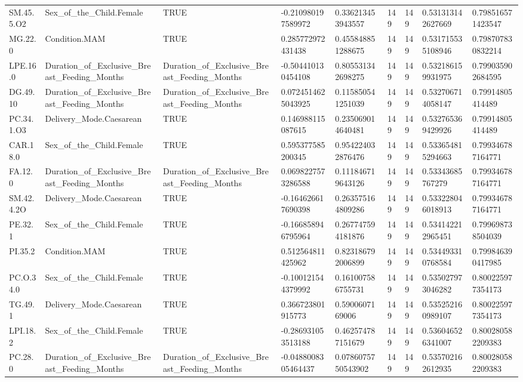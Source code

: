 \begin{longtable}{lllllllll}
SM.45.5.O2 & Sex\_of\_the\_Child.Female & TRUE & -0.210980197589972 & 0.336213453943557 & 149 & 149 & 0.531313142627669 & 0.798516571423547 \\
MG.22.0 & Condition.MAM & TRUE & 0.285772972431438 & 0.455848851288675 & 149 & 149 & 0.531715535108946 & 0.798707830832214 \\
LPE.16.0 & Duration\_of\_Exclusive\_Breast\_Feeding\_Months & Duration\_of\_Exclusive\_Breast\_Feeding\_Months & -0.504410130454108 & 0.805531342698275 & 149 & 149 & 0.532186159931975 & 0.799035902684595 \\
DG.49.10 & Duration\_of\_Exclusive\_Breast\_Feeding\_Months & Duration\_of\_Exclusive\_Breast\_Feeding\_Months & 0.0724514625043925 & 0.115850541251039 & 149 & 149 & 0.532706714058147 & 0.79914805414489 \\
PC.34.1.O3 & Delivery\_Mode.Caesarean & TRUE & 0.146988115087615 & 0.235069014640481 & 149 & 149 & 0.532765369429926 & 0.79914805414489 \\
CAR.18.0 & Sex\_of\_the\_Child.Female & TRUE & 0.595377585200345 & 0.954224032876476 & 149 & 149 & 0.533654815294663 & 0.799346787164771 \\
FA.12.0 & Duration\_of\_Exclusive\_Breast\_Feeding\_Months & Duration\_of\_Exclusive\_Breast\_Feeding\_Months & 0.0698227573286588 & 0.111846719643126 & 149 & 149 & 0.53343685767279 & 0.799346787164771 \\
SM.42.4.2O & Delivery\_Mode.Caesarean & TRUE & -0.164626617690398 & 0.263575164809286 & 149 & 149 & 0.533228046018913 & 0.799346787164771 \\
PE.32.1 & Sex\_of\_the\_Child.Female & TRUE & -0.166858946795964 & 0.267747594181876 & 149 & 149 & 0.534142212965451 & 0.799698738504039 \\
PI.35.2 & Condition.MAM & TRUE & 0.512564811425962 & 0.823186792006899 & 149 & 149 & 0.534493310768584 & 0.799846390417985 \\
PC.O.34.0 & Sex\_of\_the\_Child.Female & TRUE & -0.100121544379992 & 0.161007586755731 & 149 & 149 & 0.535027973046282 & 0.800225977354173 \\
TG.49.1 & Delivery\_Mode.Caesarean & TRUE & 0.366723801915773 & 0.5900607169006 & 149 & 149 & 0.535252160989107 & 0.800225977354173 \\
LPI.18.2 & Sex\_of\_the\_Child.Female & TRUE & -0.286931053513188 & 0.462574787151679 & 149 & 149 & 0.536046526341007 & 0.800280582209383 \\
PC.28.0 & Duration\_of\_Exclusive\_Breast\_Feeding\_Months & Duration\_of\_Exclusive\_Breast\_Feeding\_Months & -0.0488008305464437 & 0.0786075750543902 & 149 & 149 & 0.535702162612935 & 0.800280582209383 \\

\end{longtable}
